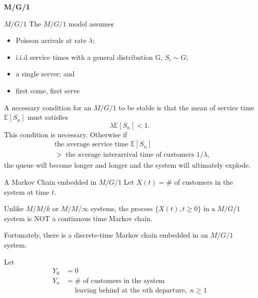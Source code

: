 \documentclass[letterpaper]{beamer}
\def\E{\mathbb E}
\begin{document}
\begin{frame}
	\vfill
	\center
	\bf \large M/G/1
	\vfill
\end{frame}

\begin{frame}{$M/G/1$}
The $M/G/1$ model assumes
\begin{itemize}
\item Poisson arrivals at rate $\lambda$;
\item i.i.d service times with a general distribution G, $S_i\sim G$;
\item a single server; and
\item first come, first serve
\end{itemize}
A necessary condition for an $M/G/1$ to be stable is that the mean of service time $\E[S_n]$ must satisfies
$$\lambda\E[S_n] < 1.$$
This condition is necessary. Otherwise if
\begin{align*}
&\mbox{the average service time }\E[S_n] \\
&>\;\mbox{the average interarrival time of customers }1/\lambda,
\end{align*}
the queue will become longer and longer and the system will ultimately explode.
\end{frame}
\begin{frame}{A Markov Chain embedded in $M/G/1$}
Let $X(t)=\#$ of customers in the system at time $t$.

Unlike $M/M/k$ or $M/M/\infty$ systems, the process $\{X(t),t\ge 0\}$ in a $M/G/1$ system is NOT a continuous time Markov chain.%
\par\medskip

Fortunately, there is a discrete-time Markov chain embedded in an $M/G/1$ system.

 
Let
\begin{align*}
Y_0 &=0\\
Y_n &=\#\mbox{ of customers in the system}\\
&\quad\mbox{ leaving behind at the $n$th departure},\; n\ge 1\\
\end{align*}


\begin{center}
\end{center}
\end{frame}
\end{document}
